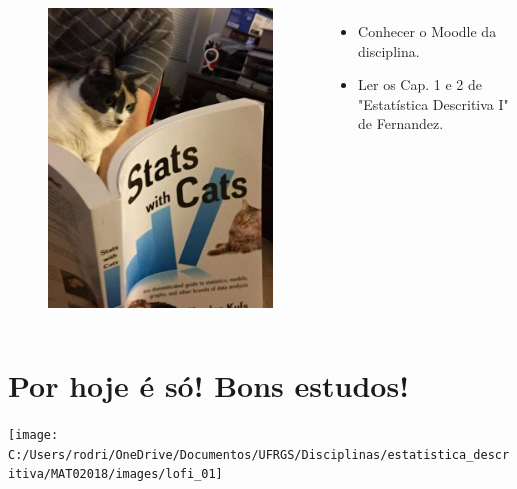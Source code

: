 \documentclass[]{tufte-book}
\begin{document}
\begin{columns}[c]
\column{2.3in}
\begin{figure}[!h]
\begin{center}
\includegraphics[width=0.9\columnwidth]{images/stats_cats.jpg}
\end{center}
\end{figure}
\column{2.3in}
\begin{itemize}\setlength{\itemsep}{+2mm}
\item Conhecer o Moodle da disciplina.
\item Ler os Cap. 1 e 2 de "Estatística Descritiva I" de Fernandez.
\end{itemize}
\end{columns}

\hypertarget{por-hoje-uxe9-suxf3-bons-estudos}{%
\section{Por hoje é só! Bons
estudos!}\label{por-hoje-uxe9-suxf3-bons-estudos}}

\begin{center}\texttt{[image: C:/Users/rodri/OneDrive/Documentos/UFRGS/Disciplinas/estatistica\_descritiva/MAT02018/images/lofi\_01]} \end{center}


\end{document}

